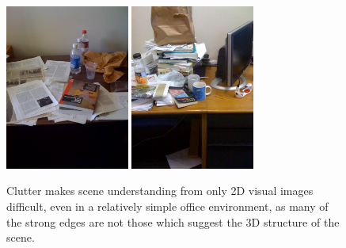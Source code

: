 \documentclass[letterpaper, 10 pt, conference]{ieeeconf}  %
\begin{document}
\begin{figure}[t]
\begin{center}
  \includegraphics[width=1.6in]{clutter1.jpg} \quad
  \includegraphics[width=1.6in]{clutter2.jpg}
\end{center}
\caption{Clutter makes scene understanding from only 2D visual images difficult, even in a relatively simple office environment, as many of the strong edges are not those which suggest the 3D structure of the scene.}
\label{fig:clutter}
\end{figure}

\end{document}
